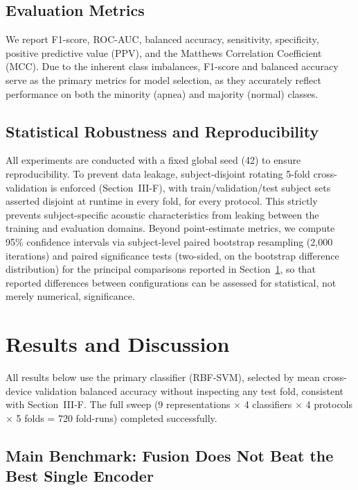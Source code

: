 \documentclass[conference]{IEEEtran}
\begin{document}
\subsection{Evaluation Metrics}

We report F1-score, ROC-AUC, balanced accuracy, sensitivity, specificity, positive predictive value
(PPV), and the Matthews Correlation Coefficient (MCC). Due to the inherent class imbalances, F1-score 
and balanced accuracy serve as the primary metrics for model selection, as they accurately reflect 
performance on both the minority (apnea) and majority (normal) classes.

\subsection{Statistical Robustness and Reproducibility}

All experiments are conducted with a fixed global seed (42) to ensure reproducibility. To prevent data leakage, subject-disjoint rotating 5-fold cross-validation is enforced (Section~III-F), with train/validation/test subject sets asserted disjoint at runtime in every fold, for every protocol. This strictly prevents subject-specific acoustic characteristics from leaking between the training and evaluation domains. Beyond point-estimate metrics, we compute 95\% confidence intervals via subject-level paired bootstrap resampling (2,000 iterations) and paired significance tests (two-sided, on the bootstrap difference distribution) for the principal comparisons reported in Section~\ref{sec:results}, so that reported differences between configurations can be assessed for statistical, not merely numerical, significance.

\section{Results and Discussion}
\label{sec:results}

All results below use the primary classifier (RBF-SVM), selected by mean cross-device validation balanced accuracy without inspecting any test fold, consistent with Section~III-F. The full sweep (9 representations $\times$ 4 classifiers $\times$ 4 protocols $\times$ 5 folds = 720 fold-runs) completed successfully.

\subsection{Main Benchmark: Fusion Does Not Beat the Best Single Encoder}
\end{document}
